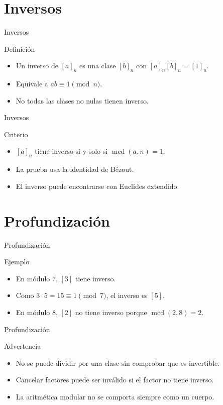 \documentclass[aspectratio=169,11pt]{beamer}
\newcommand{\mcd}{\operatorname{mcd}}
\begin{document}
\section{Inversos}

\begin{frame}{Inversos}
\begin{block}{Definición}
\begin{itemize}
  \item Un inverso de \([a]_n\) es una clase \([b]_n\) con \([a]_n[b]_n=[1]_n\).
  \item Equivale a \(ab\equiv 1\pmod n\).
  \item No todas las clases no nulas tienen inverso.
\end{itemize}
\end{block}
\end{frame}

\begin{frame}{Inversos}
\begin{block}{Criterio}
\begin{itemize}
  \item \([a]_n\) tiene inverso si y solo si \(\mcd(a,n)=1\).
  \item La prueba usa la identidad de Bézout.
  \item El inverso puede encontrarse con Euclides extendido.
\end{itemize}
\end{block}
\end{frame}

\section{Profundización}

\begin{frame}{Profundización}
\begin{block}{Ejemplo}
\begin{itemize}
  \item En módulo \(7\), \([3]\) tiene inverso.
  \item Como \(3\cdot 5=15\equiv 1\pmod 7\), el inverso es \([5]\).
  \item En módulo \(8\), \([2]\) no tiene inverso porque \(\mcd(2,8)=2\).
\end{itemize}
\end{block}
\end{frame}

\begin{frame}{Profundización}
\begin{block}{Advertencia}
\begin{itemize}
  \item No se puede dividir por una clase sin comprobar que es invertible.
  \item Cancelar factores puede ser inválido si el factor no tiene inverso.
  \item La aritmética modular no se comporta siempre como un cuerpo.
\end{itemize}
\end{block}
\end{frame}
\end{document}
